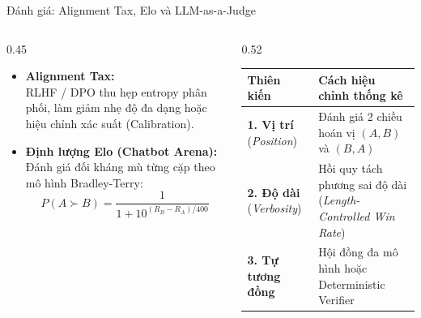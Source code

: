 \begin{frame}{Đánh giá: Alignment Tax, Elo và LLM-as-a-Judge}
  \begin{columns}[T,onlytextwidth]
    \begin{column}{0.45\textwidth}
      \footnotesize
      \begin{itemize}\setlength{\itemsep}{4pt}
        \item \textbf{Alignment Tax:}\\
          RLHF / DPO thu hẹp entropy phân phối, làm giảm nhẹ độ đa dạng hoặc hiệu chỉnh xác suất (Calibration).
        \item \textbf{Định lượng Elo (Chatbot Arena):}\\
          Đánh giá đối kháng mù từng cặp theo mô hình Bradley-Terry:
          \[
            P(A \succ B) = \frac{1}{1 + 10^{(R_B - R_A)/400}}
          \]
      \end{itemize}
    \end{column}
    \begin{column}{0.52\textwidth}
      \footnotesize
      \renewcommand{\arraystretch}{1.22}
      \begin{tabularx}{\textwidth}{@{}l X@{}}
        \toprule
        \textbf{Thiên kiến} & \textbf{Cách hiệu chỉnh thống kê} \\
        \midrule
        \textbf{1. Vị trí} (\textit{Position}) & Đánh giá 2 chiều hoán vị $(A, B)$ và $(B, A)$ \\

        \textbf{2. Độ dài} (\textit{Verbosity}) & Hồi quy tách phương sai độ dài (\textit{Length-Controlled Win Rate}) \\

        \textbf{3. Tự tương đồng} & Hội đồng đa mô hình hoặc Deterministic Verifier \\
        \bottomrule
      \end{tabularx}
    \end{column}
  \end{columns}
  \par\vspace{0pt}
\end{frame}

